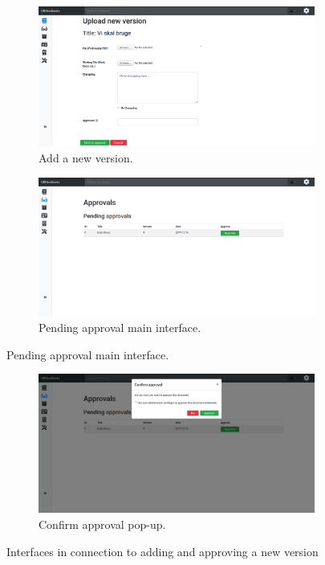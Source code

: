 \begin{figure}[H]
	\centering
	\begin{subfigure}[b]{0.48\textwidth}
		\includegraphics[width=\textwidth]{billeder/iteration3Prototyper/Ver.png}
		\caption{Add a new version.}
		\label{fig:5-Add}
	\end{subfigure}
	\quad
	\begin{subfigure}[b]{0.48\textwidth}
		\includegraphics[width=\textwidth]{billeder/iteration3Prototyper/Approve.png}
		\caption{Pending approval main interface.}
		\label{fig:5-Approve}
	\end{subfigure}
\end{figure}
\begin{figure}[H]\ContinuedFloat 
	\centering
	\begin{subfigure}[b]{0.48\textwidth}
		\includegraphics[width=\textwidth]{billeder/iteration3Prototyper/AppConfirm.png}
		\caption{Confirm approval pop-up.}
		\label{fig:5-AppConfirm}
	\end{subfigure}
	\caption{Interfaces in connection to adding and approving a new version}\label{fig:5-Approval}
\end{figure}


